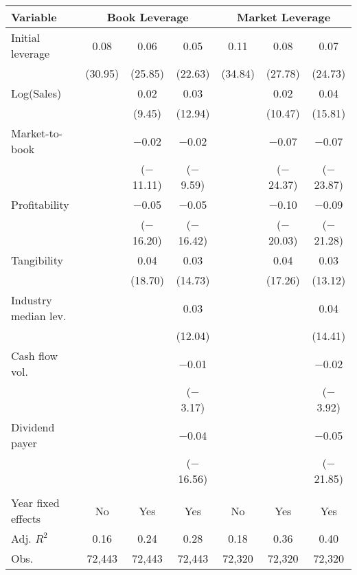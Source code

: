 \begin{tabular}{l*{6}{c}}
\toprule
Variable & \multicolumn{3}{c}{Book Leverage} & \multicolumn{3}{c}{Market Leverage} \\ \midrule
Initial leverage&        0.08&        0.06&        0.05&        0.11&        0.08&        0.07\\
            &     (30.95)&     (25.85)&     (22.63)&     (34.84)&     (27.78)&     (24.73)\\
\addlinespace
Log(Sales)  &            &        0.02&        0.03&            &        0.02&        0.04\\
            &            &      (9.45)&     (12.94)&            &     (10.47)&     (15.81)\\
\addlinespace
Market-to-book&            &     $-$0.02&     $-$0.02&            &     $-$0.07&     $-$0.07\\
            &            &  ($-$11.11)&   ($-$9.59)&            &  ($-$24.37)&  ($-$23.87)\\
\addlinespace
Profitability&            &     $-$0.05&     $-$0.05&            &     $-$0.10&     $-$0.09\\
            &            &  ($-$16.20)&  ($-$16.42)&            &  ($-$20.03)&  ($-$21.28)\\
\addlinespace
Tangibility &            &        0.04&        0.03&            &        0.04&        0.03\\
            &            &     (18.70)&     (14.73)&            &     (17.26)&     (13.12)\\
\addlinespace
Industry median lev.&            &            &        0.03&            &            &        0.04\\
            &            &            &     (12.04)&            &            &     (14.41)\\
\addlinespace
Cash flow vol.&            &            &     $-$0.01&            &            &     $-$0.02\\
            &            &            &   ($-$3.17)&            &            &   ($-$3.92)\\
\addlinespace
Dividend payer&            &            &     $-$0.04&            &            &     $-$0.05\\
            &            &            &  ($-$16.56)&            &            &  ($-$21.85)\\
\\
Year fixed effects&          No&         Yes&         Yes&          No&         Yes&         Yes\\
Adj. $ R^2$ &        0.16&        0.24&        0.28&        0.18&        0.36&        0.40\\
Obs.        &      72,443&      72,443&      72,443&      72,320&      72,320&      72,320\\
\bottomrule
\end{tabular}
